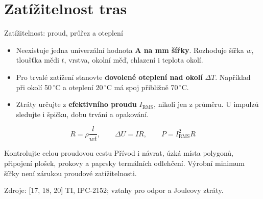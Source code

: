 \documentclass{beamer}
\begin{document}
\section{\texorpdfstring{Zatížitelnost tras}{Zatizitelnost tras}}
\begin{frame}[t]{Zatížitelnost: proud, průřez a oteplení}
	\small
	\begin{itemize}
		\item Neexistuje jedna univerzální hodnota \textbf{A na mm šířky}. Rozhoduje šířka $w$, tloušťka mědi $t$, vrstva, okolní měď, chlazení i teplota okolí.
		\item Pro trvalé zatížení stanovte \textbf{dovolené oteplení nad okolí} $\Delta T$. Například při okolí 50\,$^\circ$C a oteplení 20\,$^\circ$C má spoj přibližně 70\,$^\circ$C.
		\item Ztráty určujte z \textbf{efektivního proudu} $I_{\text{RMS}}$, nikoli jen z průměru. U impulzů sledujte i špičku, dobu trvání a opakování.
	\end{itemize}
	\[
		R=\rho\frac{l}{w t},\qquad \Delta U=I R,\qquad P=I_{\text{RMS}}^2 R
	\]
	\begin{block}{Kontrolujte celou proudovou cestu}
	Přívod i návrat, úzká místa polygonů, připojení plošek, prokovy a paprsky termálních odlehčení. Výrobní minimum šířky není zárukou proudové zatížitelnosti.
	\end{block}
	\vfill
	{\tiny Zdroje: [17, 18, 20] TI, IPC-2152; vztahy pro odpor a Jouleovy ztráty.}
\end{frame}
\end{document}
